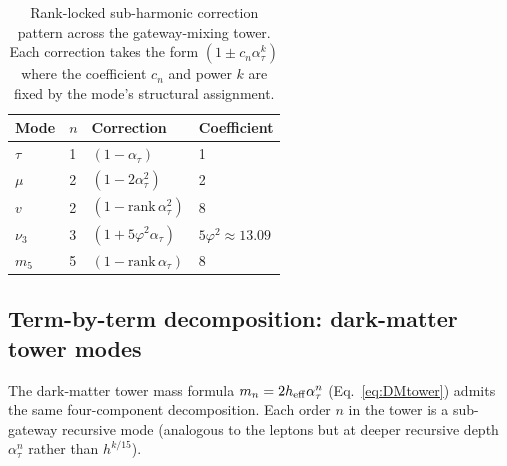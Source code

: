 ﻿\documentclass[reprint,amsmath,amssymb,aps,prd,longbibliography,floatfix]{revtex4-2}
\begin{document}
\begin{table}[h]
\centering
\caption{Rank-locked sub-harmonic correction pattern across the
gateway-mixing tower. Each correction takes the form
$(1 \pm c_n \alpha_\tau^k)$ where the coefficient $c_n$ and power $k$
are fixed by the mode's structural assignment.}
\label{tab:subharmonic}
\begin{tabular}{llll}
\toprule
Mode & $n$ & Correction & Coefficient \\
\midrule
$\tau$ & 1 & $(1 - \alpha_\tau)$ & 1 \\
$\mu$ & 2 & $(1 - 2\alpha_\tau^2)$ & 2 \\
$v$ & 2 & $(1 - \text{rank}\,\alpha_\tau^2)$ & 8 \\
$\nu_3$ & 3 & $(1 + 5\varphi^2 \alpha_\tau)$ & $5\varphi^2 \approx 13.09$ \\
$m_5$ & 5 & $(1 - \text{rank}\,\alpha_\tau)$ & 8 \\
\bottomrule
\end{tabular}
\end{table}

\subsection{Term-by-term decomposition: dark-matter tower modes}
\label{sub:DM-terms}

The dark-matter tower mass formula
$m_n = 2 h_{\rm eff} \alpha_\tau^n$ (Eq.~\eqref{eq:DMtower}) admits
the same four-component decomposition. Each order $n$ in the tower
is a sub-gateway recursive mode (analogous to the leptons but at
deeper recursive depth $\alpha_\tau^n$ rather than $h^{k/15}$).
\end{document}
